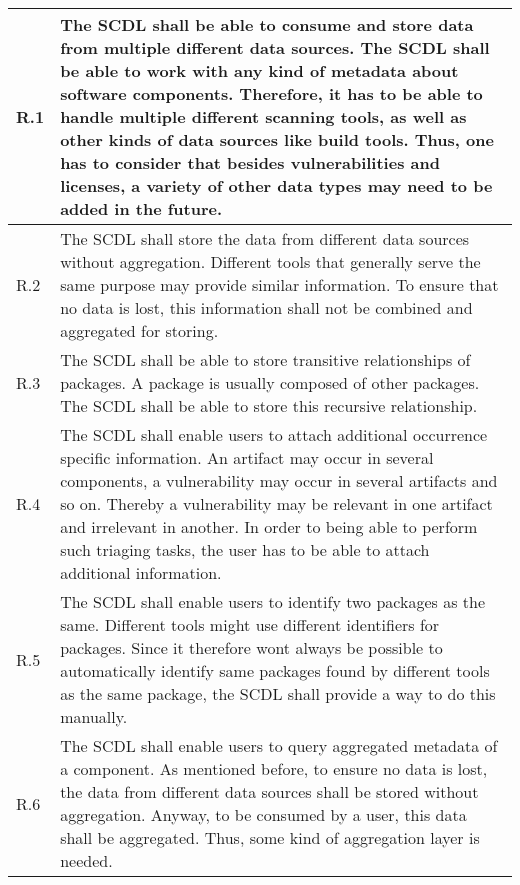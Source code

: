 \begin{xltabular}{\linewidth}{|l|X|}
	R.1 & The SCDL shall be able to consume and store data from multiple different data sources.\newline\newline
	The SCDL shall be able to work with any kind of metadata about software components. Therefore, it has to be able to handle multiple different scanning tools, as well as other kinds of data sources like build tools. Thus, one has to consider that besides vulnerabilities and licenses, a variety of other data types may need to be added in the future. \\
	\hline
	R.2 & The SCDL shall store the data from different data sources without aggregation.\newline\newline
	Different tools that generally serve the same purpose may provide similar information. To ensure that no data is lost, this information shall not be combined and aggregated for storing.\\
	\hline
	R.3 & The SCDL shall be able to store transitive relationships of packages.\newline\newline
	A package is usually composed of other packages. The SCDL shall be able to store this recursive relationship.\\
	\hline
	R.4 & The SCDL shall enable users to attach additional occurrence specific information.\newline\newline
	An artifact may occur in several components, a vulnerability may occur in several artifacts and so on. Thereby a vulnerability may be relevant in one artifact and irrelevant in another. In order to being able to perform such triaging tasks, the user has to be able to attach additional information.\\
	\hline
	R.5 & The SCDL shall enable users to identify two packages as the same.\newline\newline
	Different tools might use different identifiers for packages. Since it therefore wont always be possible to automatically identify same packages found by different tools as the same package, the SCDL shall provide a way to do this manually.\\
	\hline
	R.6 & The SCDL shall enable users to query aggregated metadata of a component.\newline\newline
	As mentioned before, to ensure no data is lost, the data from different data sources shall be stored without aggregation. Anyway, to be consumed by a user, this data shall be aggregated. Thus, some kind of aggregation layer is needed.\\

\end{xltabular}
